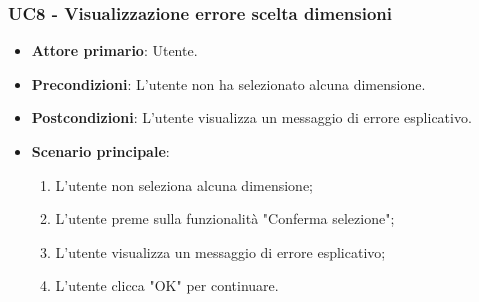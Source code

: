 \subsubsection{UC8 - Visualizzazione errore scelta dimensioni}
\begin{itemize}
	\item \textbf{Attore primario}: Utente.
	\item \textbf{Precondizioni}: L'utente non ha selezionato alcuna dimensione.
	\item \textbf{Postcondizioni}: L'utente visualizza un messaggio di errore esplicativo.
	\item \textbf{Scenario principale}:
		\begin{enumerate}
			\item L'utente non seleziona alcuna dimensione;
			\item L'utente preme sulla funzionalità "Conferma selezione";
			\item L'utente visualizza un messaggio di errore esplicativo;
			\item L'utente clicca "OK" per continuare.
		\end{enumerate}
\end{itemize}